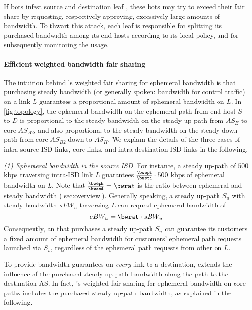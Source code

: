 If bots infest source and destination leaf \ADs, these bots may try to exceed
their fair share by requesting, respectively approving, excessively large
amounts of bandwidth. To thwart this attack, each leaf \AD is responsible for
splitting its purchased bandwidth among its end hosts according to its local
policy, and for subsequently monitoring the usage.


\paragraph{Efficient weighted bandwidth fair sharing} The intuition behind
\name's weighted fair sharing for ephemeral bandwidth is that purchasing steady
bandwidth (or generally spoken: bandwidth for control traffic) on a link $L$
guarantees a proportional amount of ephemeral bandwidth on $L$. In
\autoref{fig:topology}, the ephemeral bandwidth on the ephemeral path from end
host $S$ to $D$ is proportional to the steady bandwidth on the steady up-path
from $AS_E$ to core $AS_{A2}$, and also proportional to the steady bandwidth on
the steady down-path from core $AS_{B2}$ down to $AS_H$.
We explain the details of the three cases of intra-source-ISD links, core
links, and intra-destination-ISD links in the following.

\emph{(1) Ephemeral bandwidth in the source ISD.}
For instance, a steady up-path of $500$ kbps traversing intra-ISD
link $L$ guarantees $\frac{\bweph}{\bwstd}\cdot500$ kbps of ephemeral
bandwidth on $L$. Note that $\frac{\bweph}{\bwstd}=\bwrat$ is the
ratio between ephemeral and steady bandwidth
(\autoref{sec:overview}). Generally speaking, a steady up-path
$S_u$ with steady bandwidth $sBW_u$ traversing $L$ can request
ephemeral bandwidth of
\begin{equation}
  \label{eq:eph:source}
  eBW_u = \bwrat \cdot sBW_u
\end{equation}
Consequently, an \AD that purchases a steady up-path $S_u$ can
guarantee its customers a fixed amount of ephemeral bandwidth for
customers' ephemeral path requests launched via $S_u$, regardless of
the ephemeral path requests from other \ADs on $L$.

To provide bandwidth guarantees on \emph{every} link to a destination,
\name extends the influence of the purchased steady up-path
bandwidth along the path to the destination AS. In fact, \name's
weighted fair sharing for ephemeral bandwidth on core paths includes
the purchased steady up-path bandwidth, as explained in the following.

